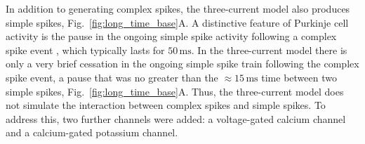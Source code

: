 \documentclass[utf8]{frontiersSCNS} %
\newcommand{\mse}{\,\mathrm{ms}}
\begin{document}

In addition to generating complex spikes, the three-current model also
produces simple spikes, Fig.~\ref{fig:long_time_base}A. A distinctive
feature of Purkinje cell activity is the pause in the ongoing simple
spike activity following a complex spike event \cite{BellGrimm1969,GranitPhillips1956,Thach1967}, which typically lasts for
$50\mse$. In the three-current model there is only a very brief
cessation in the ongoing simple spike train following the complex
spike event, a pause that was no greater than the $\approx 15\mse$
time between two simple spikes, Fig.~\ref{fig:long_time_base}A. Thus,
the three-current model does not simulate the interaction
between complex spikes and simple spikes. To address this, two further
channels were added: a voltage-gated calcium channel and a
calcium-gated potassium channel.


\end{document}
